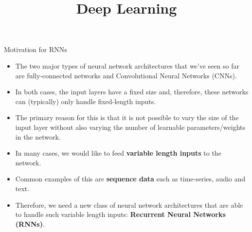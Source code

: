 






\newcommand{\titlefigure}{figure/rnn_sample_z5.png}
\newcommand{\learninggoals}{
  \item Motivation
  \item Introduction
  \item Computational Graph
}

\title{Deep Learning}
\date{}







\begin{frame} {Motivation for RNNs}
  \begin{itemize}
    \item The two major types of neural network architectures that we've seen so far are fully-connected networks and Convolutional Neural Networks (CNNs).
    \item In both cases, the input layers have a fixed size and, therefore, these networks can (typically) only handle fixed-length inputs.
    \item The primary reason for this is that it is not possible to vary the size of the input layer without also varying the number of learnable parameters/weights in the network.
    \item In many cases, we would like to feed \textbf{variable length inputs} to the network.
    \item Common examples of this are \textbf{sequence data} such as time-series, audio and text.
    \item Therefore, we need a new class of neural network architectures that are able to handle such variable length inputs: \textbf{Recurrent Neural Networks (RNNs)}.
  \end{itemize}
\end{frame}



 
